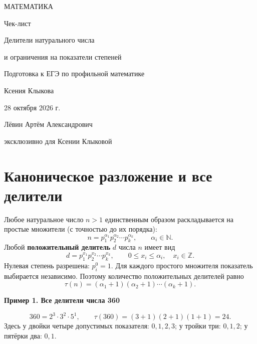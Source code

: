 \documentclass[a4paper,12pt]{article}
\newcommand{\Section}[1]{\vspace{4pt}\section{\textcolor{darkaccent}{#1}}\vspace{-4pt}}
\newcommand{\Key}[1]{\textcolor{darkaccent}{#1}}
\newcommand{\Example}[1]{\par\needspace{6\baselineskip}\medskip\Key{\textbf{#1}}\par\smallskip}
\begin{document}
\begin{titlepage}
\thispagestyle{empty}
\begin{center}
\vspace*{28mm}
{\large\textcolor{darkaccent}{МАТЕМАТИКА}}\par
\vspace{17mm}
{\LARGE Чек-лист}\par
\vspace{12mm}
{\Large\textcolor{accent}{Делители натурального числа}}\par
\vspace{3mm}
{\Large\textcolor{accent}{и ограничения на показатели степеней}}\par
\vspace{17mm}
{\normalsize Подготовка к ЕГЭ по профильной математике}\par
\vspace{39mm}
{\large Ксения Клыкова}\par
\vspace{12mm}
{28 октября 2026 г.}\par
\vfill
{\small Лёвин Артём Александрович}\par
{\small эксклюзивно для Ксении Клыковой}\par
\vspace{14mm}
\vspace{3mm}
\end{center}
\end{titlepage}
\setcounter{page}{1}

\Section{Каноническое разложение и все делители}
Любое натуральное число $n>1$ единственным образом раскладывается на простые множители (с точностью до их порядка):
\[
 n=p_1^{\alpha_1}p_2^{\alpha_2}\cdots p_k^{\alpha_k},
 \qquad \alpha_i\in\mathbb N.
\]
Любой \textbf{положительный делитель} $d$ числа $n$ имеет вид
\[
 d=p_1^{x_1}p_2^{x_2}\cdots p_k^{x_k},
 \qquad 0\le x_i\le\alpha_i,
 \quad x_i\in\mathbb Z.
\]
Нулевая степень разрешена: $p_i^0=1$. Для каждого простого множителя показатель выбирается независимо. Поэтому количество положительных делителей равно
\[
 \boxed{\tau(n)=(\alpha_1+1)(\alpha_2+1)\cdots(\alpha_k+1).}
\]
\Example{Пример 1. Все делители числа 360}
\[
360=2^3\cdot3^2\cdot5^1,
\qquad \tau(360)=(3+1)(2+1)(1+1)=24.
\]
Здесь у двойки четыре допустимых показателя: $0,1,2,3$; у тройки три: $0,1,2$; у пятёрки два: $0,1$.
\end{document}
